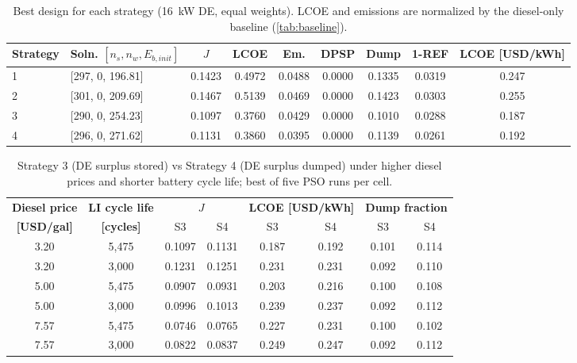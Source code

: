 \documentclass[final,3p,times]{elsarticle}
\begin{document}
\begin{table}[htbp]
\centering
\small
\begin{tabular}{l l c c c c c c c}
\toprule
\textbf{Strategy} & \textbf{Soln. $[n_s, n_w, E_{b,init}]$} & \textbf{$J$} & \textbf{LCOE} & \textbf{Em.} & \textbf{DPSP} & \textbf{Dump} & \textbf{1-REF} & \textbf{LCOE [USD/kWh]} \\
\midrule
1 & [297, 0, 196.81] & 0.1423 & 0.4972 & 0.0488 & 0.0000 & 0.1335 & 0.0319 & 0.247 \\
2 & [301, 0, 209.69] & 0.1467 & 0.5139 & 0.0469 & 0.0000 & 0.1423 & 0.0303 & 0.255 \\
3 & [290, 0, 254.23] & 0.1097 & 0.3760 & 0.0429 & 0.0000 & 0.1010 & 0.0288 & 0.187 \\
4 & [296, 0, 271.62] & 0.1131 & 0.3860 & 0.0395 & 0.0000 & 0.1139 & 0.0261 & 0.192 \\
\bottomrule
\end{tabular}
\caption{\label{tab:strat} Best design for each strategy (16~kW DE, equal weights). LCOE and emissions are normalized by the diesel-only baseline (\cref{tab:baseline}).}
\end{table}

\begin{table}[htbp]
\centering
\small
\begin{tabular}{c c c c c c c c}
\toprule
\textbf{Diesel price} & \textbf{LI cycle life} & \multicolumn{2}{c}{\textbf{$J$}} & \multicolumn{2}{c}{\textbf{LCOE [USD/kWh]}} & \multicolumn{2}{c}{\textbf{Dump fraction}} \\
\textbf{[USD/gal]} & \textbf{[cycles]} & S3 & S4 & S3 & S4 & S3 & S4 \\
\midrule
3.20 & 5,475 & 0.1097 & 0.1131 & 0.187 & 0.192 & 0.101 & 0.114 \\
3.20 & 3,000 & 0.1231 & 0.1251 & 0.231 & 0.231 & 0.092 & 0.110 \\
5.00 & 5,475 & 0.0907 & 0.0931 & 0.203 & 0.216 & 0.100 & 0.108 \\
5.00 & 3,000 & 0.0996 & 0.1013 & 0.239 & 0.237 & 0.092 & 0.112 \\
7.57 & 5,475 & 0.0746 & 0.0765 & 0.227 & 0.231 & 0.100 & 0.102 \\
7.57 & 3,000 & 0.0822 & 0.0837 & 0.249 & 0.247 & 0.092 & 0.112 \\
\bottomrule
\end{tabular}
\caption{\label{tab:strategy_stress} Strategy 3 (DE surplus stored) vs Strategy 4 (DE surplus dumped) under higher diesel prices and shorter battery cycle life; best of five PSO runs per cell.}
\end{table}
\end{document}
